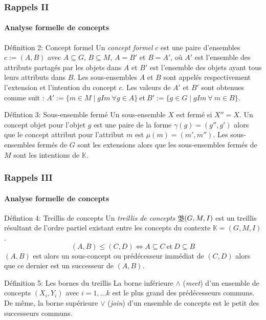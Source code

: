 \documentclass[french]{beamer}
\def\KK{\mathbb{K}}
\begin{document}
\begin{frame}
\frametitle{Rappels II}
\framesubtitle{Analyse formelle de concepts}
\begin{block}{Définition 2: Concept formel}
Un \emph{concept formel} $c$ est une paire d'ensembles $c:= (A,B)$ avec $A \subseteq G$, $B \subseteq M$, $A=B'$ et $B=A'$, où $A'$ est l'ensemble des attributs partagés par les objets dans $A$ et $B'$ est l'ensemble des objets ayant tous leurs attributs dans $B$. Les sous-ensembles $A$ et $B$ sont appelés respectivement l'extension et l'intention du concept $c$. Les valeurs de $A'$ et $B'$ sont obtenues comme suit : 
$A':=\{m \in M \mid g I m\ \forall g \in A\}\ \text{et}\ B':=\{g \in G \mid g I m\ \forall~m \in B\}$.
\end{block}
\begin{block}{Défintion 3: Sous-ensemble fermé}
Un sous-ensemble $X$ est fermé si $X''=X$. Un concept objet pour l'objet $g$ est une paire de la forme $\gamma(g)=(g'', g')$ alors que le concept attribut pour l'attribut $m$ est $\mu(m)=(m', m'')$.
Les sous-ensembles fermés de $G$ sont les extensions alors que les sous-ensembles fermés de $M$ sont les intentions de $\KK$.
\end{block}
\end{frame}

\begin{frame}
\frametitle{Rappels III}
\framesubtitle{Analyse formelle de concepts}
\begin{block}{Défintion 4: Treillis de concepts}
Un \textit{treillis de concepts} $\underline{{\mathfrak B}} (G,M,\mathrel{I})$ est un treillis résultant de l'ordre partiel existant entre les concepts du contexte $\KK = (G,M,I)$.
$$(A,B) \leq (C,D) \Leftrightarrow A \subseteq C\ \text{et}\ D \subseteq B$$
$(A, B)$ est alors un sous-concept ou prédécesseur immédiat de $(C, D)$ alors que ce dernier est un successeur de $(A, B)$.
\end{block}
\begin{block}{Définition 5: Les bornes du treillis}
La borne inférieure $\wedge$ (\emph{meet}) d'un ensemble de concepts $(X_i, Y_i)$ avec $i = 1, \ldots k$ est le plus grand des prédécesseurs communs. De même, la borne supérieure $\vee$ (\emph{join}) d'un ensemble de concepts est le petit des successeurs communs.
\end{block}
\end{frame}
\end{document}
